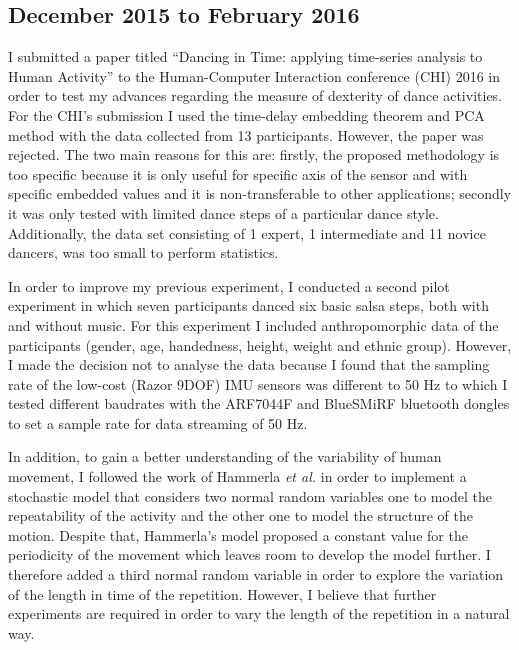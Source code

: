 \documentclass[9pt,journal,onecolumn,compsoc]{IEEEtran}
\begin{document}
\subsection{December 2015 to February 2016}

I submitted a paper titled ``Dancing in Time: applying time-series analysis to Human Activity''
to the Human-Computer Interaction conference (CHI) 2016 in order to test my advances regarding the measure of dexterity
of dance activities. For the CHI's submission I used the time-delay embedding theorem and PCA method
with the data collected from 13 participants.
However, the paper was rejected.
The two main reasons for this are:
firstly, the proposed methodology is too specific
because it is only useful for specific axis of the sensor and with specific embedded values
and it is non-transferable to other applications;
secondly it was only tested with limited dance steps of a particular dance style.
Additionally, the data set consisting of 1 expert,
1 intermediate and 11 novice dancers, was too small to perform statistics.

In order to improve my previous experiment,
I conducted a second pilot experiment in which seven participants danced
six basic salsa steps, both with and without music.
For this experiment I included anthropomorphic data of the participants
(gender, age, handedness, height, weight and ethnic group).
However,
I made the decision not to analyse the data because I found that the
sampling rate of the low-cost (Razor 9DOF) IMU sensors was different to 50 Hz
to which I tested different baudrates with the ARF7044F and BlueSMiRF bluetooth dongles
to set a sample rate for data streaming of 50 Hz.


In addition, to gain a better understanding of the variability of human movement,
I followed the work of Hammerla  \textit{et al.} \cite{Hammerla2011} in order to implement a stochastic model
that considers two normal random variables one to model the repeatability of the activity
and the other one to model the structure of the motion.
Despite that,
Hammerla's model proposed a constant value for the periodicity of the movement
which leaves room to develop the model further.
I therefore added a third normal random variable
in order to explore the variation of the length in time of the repetition.
However, I believe that further experiments
are required in order to vary the length of the repetition in a natural way.
\end{document}
